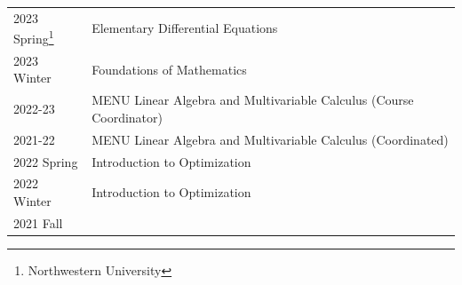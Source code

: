 \documentclass[
]{report}
\begin{document}
\begin{longtable}[]{@{}ll@{}}
\toprule
\endhead
\begin{minipage}[t]{0.37\columnwidth}\raggedright
2023 Spring\footnote{Northwestern University}\strut
\end{minipage} & \begin{minipage}[t]{0.57\columnwidth}\raggedright
Elementary Differential Equations\strut
\end{minipage}\tabularnewline
\begin{minipage}[t]{0.37\columnwidth}\raggedright
2023 Winter\strut
\end{minipage} & \begin{minipage}[t]{0.57\columnwidth}\raggedright
Foundations of Mathematics\strut
\end{minipage}\tabularnewline
\begin{minipage}[t]{0.37\columnwidth}\raggedright
2022-23\strut
\end{minipage} & \begin{minipage}[t]{0.57\columnwidth}\raggedright
MENU Linear Algebra and Multivariable Calculus (Course Coordinator)\strut
\end{minipage}\tabularnewline
\begin{minipage}[t]{0.37\columnwidth}\raggedright
2021-22\strut
\end{minipage} & \begin{minipage}[t]{0.57\columnwidth}\raggedright
MENU Linear Algebra and Multivariable Calculus (Coordinated)\strut
\end{minipage}\tabularnewline
\begin{minipage}[t]{0.37\columnwidth}\raggedright
2022 Spring\strut
\end{minipage} & \begin{minipage}[t]{0.57\columnwidth}\raggedright
Introduction to Optimization\strut
\end{minipage}\tabularnewline
\begin{minipage}[t]{0.37\columnwidth}\raggedright
2022 Winter\strut
\end{minipage} & \begin{minipage}[t]{0.57\columnwidth}\raggedright
Introduction to Optimization\strut
\end{minipage}\tabularnewline
\begin{minipage}[t]{0.37\columnwidth}\raggedright
2021 Fall\strut
\end{minipage} & \begin{minipage}[t]{0.57\columnwidth}\raggedright

\end{minipage}
\end{longtable}
\end{document}
